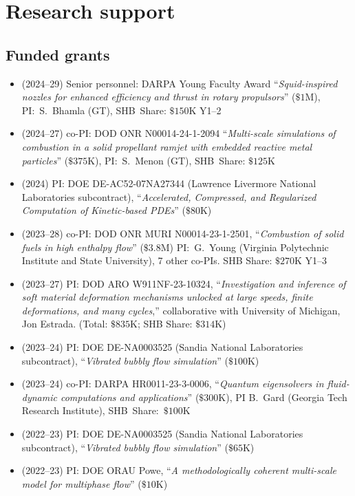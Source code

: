 \section{Research support}



\subsection{Funded grants}

\begin{itemize}
    \item (2024--29) Senior personnel: DARPA Young Faculty Award ``\textit{Squid-inspired nozzles for enhanced  efficiency and thrust in rotary propulsors}'' ($\$1$M), PI:~S.~Bhamla (GT), SHB~Share: $\$150$K Y1--2
    \item (2024--27) co-PI: DOD ONR N00014-24-1-2094 ``\textit{Multi-scale simulations of combustion in a solid propellant ramjet with embedded reactive metal particles}'' ($\$375$K), PI:~S.~Menon (GT), SHB~Share: $\$125$K 
    \item (2024) PI: DOE DE-AC52-07NA27344 (Lawrence Livermore National Laboratories subcontract), ``\textit{Accelerated, Compressed, and Regularized Computation of Kinetic-based PDEs}'' ($\$80$K)
    \item (2023--28) co-PI: DOD ONR MURI N00014-23-1-2501, ``\textit{Combustion of solid fuels in high enthalpy flow}'' ($\$3.8$M) PI:~G.~Young (Virginia Polytechnic Institute and State University), 7 other co-PIs. SHB Share: $\$270$K Y1--3
    \item (2023--27) PI: DOD ARO W911NF-23-10324, ``\textit{Investigation and inference of soft material deformation mechanisms unlocked at large speeds, finite deformations, and many cycles},'' collaborative with University of Michigan, Jon Estrada. (Total: $\$835$K; SHB Share: $\$314$K)
    \item (2023--24) PI: DOE DE-NA0003525 (Sandia National Laboratories subcontract), ``\textit{Vibrated bubbly flow simulation}'' ($\$100$K)
    \item (2023--24) co-PI: DARPA HR0011-23-3-0006, ``\textit{Quantum eigensolvers in fluid-dynamic computations and applications}'' ($\$300$K), PI B.~Gard (Georgia Tech Research Institute), SHB~Share:~$\$100$K
    \item (2022--23) PI: DOE DE-NA0003525 (Sandia National Laboratories subcontract), ``\textit{Vibrated bubbly flow simulation}'' ($\$65$K)
    \item (2022--23) PI: DOE ORAU Powe, ``\textit{A methodologically coherent multi-scale model for multiphase flow}'' ($\$10$K)

\end{itemize}
